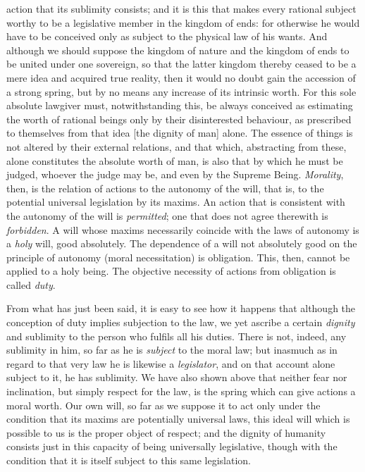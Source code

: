 action that its sublimity consists; and it is this that makes every
rational subject worthy to be a legislative member in the kingdom of
ends: for otherwise he would have to be conceived only as subject to
the physical law of his wants. And although we should suppose the
kingdom of nature and the kingdom of ends to be united under one
sovereign, so that the latter kingdom thereby ceased to be a mere idea
and acquired true reality, then it would no doubt gain the accession
of a strong spring, but by no means any increase of its intrinsic
worth. For this sole absolute lawgiver must, notwithstanding this, be
always conceived as estimating the worth of rational beings only by
their disinterested behaviour, as prescribed to themselves from that
idea [the dignity of man] alone. The essence of things is not altered
by their external relations, and that which, abstracting from these,
alone constitutes the absolute worth of man, is also that by which he
must be judged, whoever the judge may be, and even by the Supreme
Being. \textit{Morality}, then, is the relation of actions to the
autonomy of the will, that is, to the potential universal legislation
by its maxims. An action that is consistent with the autonomy of the
will is \textit{permitted}; one that does not agree therewith is
\textit{forbidden}. A will whose maxims necessarily coincide with the
laws of autonomy is a \textit{holy} will, good absolutely. The
dependence of a will not absolutely good on the principle of autonomy
(moral necessitation) is obligation. This, then, cannot be applied to
a holy being. The objective necessity of actions from obligation is
called \textit{duty}.

From what has just been said, it is easy to see how it happens that
although the conception of duty implies subjection to the law, we yet
ascribe a certain \textit{dignity} and sublimity to the person who
fulfils all his duties. There is not, indeed, any sublimity in him, so
far as he is \textit{subject} to the moral law; but inasmuch as in
regard to that very law he is likewise a \textit{legislator}, and on
that account alone subject to it, he has sublimity. We have also shown
above that neither fear nor inclination, but simply respect for the
law, is the spring which can give actions a moral worth. Our own will,
so far as we  suppose it to act only under the condition that
its maxims are potentially universal laws, this ideal will which is
possible to us is the proper object of respect; and the dignity of
humanity consists just in this capacity of being universally
legislative, though with the condition that it is itself subject to
this same legislation.
\nowidow %

